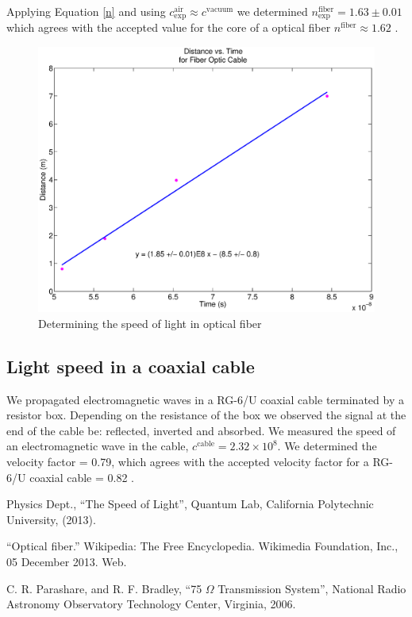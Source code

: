 Applying Equation \ref{n} and using $c^{\mathrm{air}}_{\mathrm{exp}} \approx c^{\mathrm{vacuum}}$ we determined $n^{\mathrm{fiber}}_{\mathrm{exp}} = 1.63 \pm 0.01$ which agrees with the accepted value for the core of a optical fiber $n^{\mathrm{fiber}} \approx 1.62$ \cite{wiki}.

\begin{figure}[H]
  \includegraphics[totalheight=0.6\textwidth]{figs/fiber_final}
  \caption{Determining the speed of light in optical fiber}
  \label{fiber}
\end{figure}
\subsection{Light speed in a coaxial cable}
We propagated electromagnetic waves in a RG-6/U coaxial cable terminated by a resistor box. Depending on the resistance of the box we observed the signal at the end of the cable be: reflected, inverted and absorbed. We measured the speed of an electromagnetic wave in the cable, $c^{\mathrm{cable}} = 2.32 \times 10^{8}$. We determined the velocity factor = 0.79, which agrees with the accepted velocity factor for a RG-6/U coaxial cable = 0.82 \cite{cable}.

\begin{thebibliography}{99}

 Physics Dept., ``The Speed of Light'', Quantum Lab,
  California Polytechnic University, (2013).

 ``Optical fiber.'' Wikipedia: The Free Encyclopedia. Wikimedia Foundation, Inc., 05 December 2013. Web.

 C. R. Parashare, and R. F. Bradley, ``75 $\Omega$ Transmission System'', National Radio Astronomy Observatory Technology Center, Virginia, 2006.

\end{thebibliography}


